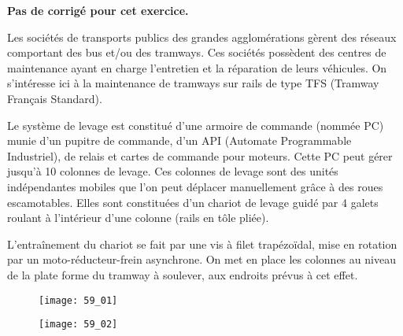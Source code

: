 \normaltrue \difficilefalse \tdifficilefalse
\correctionfalse

\setcounter{question}{0}

\ifcorrection
\else
\textbf{Pas de corrigé pour cet exercice.}
\fi

\ifprof
\else

Les sociétés de transports publics des grandes agglomérations gèrent des réseaux comportant des
bus et/ou des tramways. Ces sociétés possèdent des centres de maintenance ayant en charge
l’entretien et la réparation de leurs véhicules. %
On s'intéresse ici à la maintenance de tramways sur rails de type
TFS (Tramway Français Standard).


Le système de levage est constitué d’une armoire de commande (nommée PC) munie d’un pupitre
de commande, d’un API (Automate Programmable Industriel), de relais et cartes de commande
pour moteurs. Cette PC peut gérer jusqu’à 10 colonnes de levage. Ces colonnes de levage sont des unités indépendantes mobiles que l’on peut déplacer manuellement
grâce à des roues escamotables. Elles sont constituées d’un chariot de levage guidé par 4 galets roulant à l’intérieur d’une colonne (rails
en tôle pliée). 




L’entraînement du chariot se fait par une vis à filet trapézoïdal, mise en rotation par un moto-réducteur-frein asynchrone. On met en place les colonnes au
niveau de la plate forme du tramway à soulever, aux endroits prévus à cet effet.


\begin{figure}[H]
\centering
\texttt{[image: 59\_01]}
\end{figure}

\begin{figure}[H]
\centering
\texttt{[image: 59\_02]}
\end{figure}


